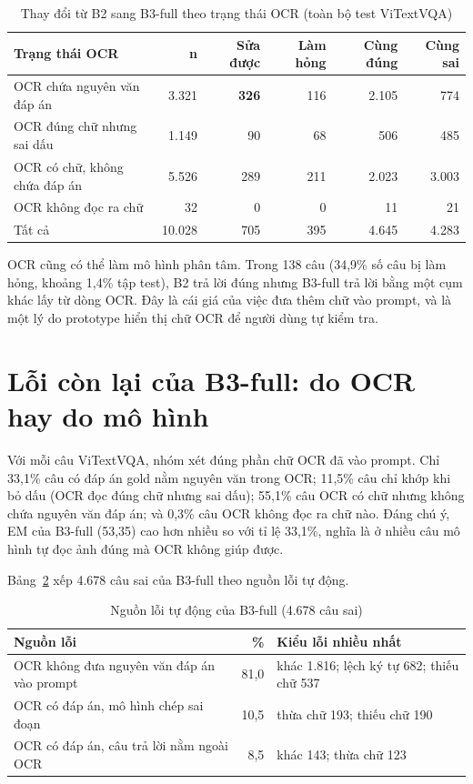 \begin{table}[htbp]
\caption{Thay đổi từ B2 sang B3-full theo trạng thái OCR (toàn bộ test ViTextVQA)}
\label{tab:dis-flips}
\centering
\small
\begin{tabular}{p{}rrrrr}
\toprule
\textbf{Trạng thái OCR} & \textbf{n} & \textbf{Sửa được} & \textbf{Làm hỏng} & \textbf{Cùng đúng} & \textbf{Cùng sai} \\
\midrule
OCR chứa nguyên văn đáp án & 3.321 & \textbf{326} & 116 & 2.105 & 774 \\
OCR đúng chữ nhưng sai dấu & 1.149 & 90 & 68 & 506 & 485 \\
OCR có chữ, không chứa đáp án & 5.526 & 289 & 211 & 2.023 & 3.003 \\
OCR không đọc ra chữ & 32 & 0 & 0 & 11 & 21 \\
\midrule
Tất cả & 10.028 & 705 & 395 & 4.645 & 4.283 \\
\bottomrule
\end{tabular}
\end{table}

OCR cũng có thể làm mô hình phân tâm. Trong 138 câu (34,9\% số câu bị làm hỏng,
khoảng 1,4\% tập test), B2 trả lời đúng nhưng B3-full trả lời bằng một cụm khác
lấy từ dòng OCR. Đây là cái giá của việc đưa thêm chữ vào prompt, và là một lý do
prototype hiển thị chữ OCR để người dùng tự kiểm tra.

\section{Lỗi còn lại của B3-full: do OCR hay do mô hình}
\label{sec:dis-remaining}

Với mỗi câu ViTextVQA, nhóm xét đúng phần chữ OCR đã vào prompt. Chỉ 33,1\% câu có
đáp án gold nằm nguyên văn trong OCR; 11,5\% câu chỉ khớp khi bỏ dấu (OCR đọc đúng
chữ nhưng sai dấu); 55,1\% câu OCR có chữ nhưng không chứa nguyên văn đáp án; và
0,3\% câu OCR không đọc ra chữ nào. Đáng chú ý, EM của B3-full (53,35) cao hơn
nhiều so với tỉ lệ 33,1\%, nghĩa là ở nhiều câu mô hình tự đọc ảnh đúng mà OCR
không giúp được.

Bảng~\ref{tab:dis-source} xếp 4.678 câu sai của B3-full theo nguồn lỗi tự động.

\begin{table}[htbp]
\caption{Nguồn lỗi tự động của B3-full (4.678 câu sai)}
\label{tab:dis-source}
\centering
\small
\begin{tabular}{p{}rp{}}
\toprule
\raggedright \textbf{Nguồn lỗi} & \raggedright \textbf{\%} & \raggedright \textbf{Kiểu lỗi nhiều nhất} \tabularnewline
\midrule
\raggedright OCR không đưa nguyên văn đáp án vào prompt & \raggedright 81,0 & \raggedright khác 1.816; lệch ký tự 682; thiếu chữ 537 \tabularnewline
\raggedright OCR có đáp án, mô hình chép sai đoạn & \raggedright 10,5 & \raggedright thừa chữ 193; thiếu chữ 190 \tabularnewline
\raggedright OCR có đáp án, câu trả lời nằm ngoài OCR & \raggedright 8,5 & \raggedright khác 143; thừa chữ 123 \tabularnewline
\bottomrule
\end{tabular}
\end{table}

